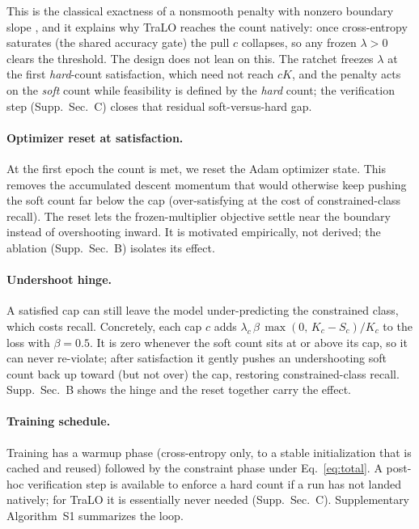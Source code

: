 \documentclass[letterpaper]{article} %
\begin{document}
\noindent This is the classical exactness of a nonsmooth penalty with nonzero boundary slope
\citep{bertsekas1982constrained,nocedal2006numerical}, and it explains why TraLO reaches the
count natively: once cross-entropy saturates (the shared accuracy gate) the pull $c$
collapses, so any frozen $\lambda>0$ clears the threshold. The design does not lean on this.
The ratchet freezes $\lambda$ at the first \emph{hard}-count satisfaction, which need not
reach $cK$, and the penalty acts on the \emph{soft} count while feasibility is defined by the
\emph{hard} count; the verification step (Supp.~Sec.~C) closes that residual soft-versus-hard
gap.

\paragraph{Optimizer reset at satisfaction.}
At the first epoch the count is met, we reset the Adam optimizer state. This removes the
accumulated descent momentum that would otherwise keep pushing the soft count far below
the cap (over-satisfying at the cost of constrained-class recall). The reset lets the
frozen-multiplier objective settle near the boundary instead of overshooting inward. It
is motivated empirically, not derived; the ablation (Supp.~Sec.~B) isolates its effect.

\paragraph{Undershoot hinge.}
A satisfied cap can still leave the model under-predicting the constrained class,
which costs recall. Concretely, each cap $c$ adds $\lambda_c\,\beta\,\max(0,\,K_c-S_c)/K_c$ to the loss
with $\beta{=}0.5$. It is zero whenever the soft count sits at or above its cap, so it
can never re-violate; after satisfaction it gently pushes an undershooting soft count
back up toward (but not over) the cap, restoring constrained-class recall.
Supp.~Sec.~B shows the hinge and the reset together carry the effect.

\paragraph{Training schedule.}
Training has a warmup phase (cross-entropy only, to a stable initialization that is
cached and reused) followed by the constraint phase under Eq.~\eqref{eq:total}. A
post-hoc verification step is available to enforce a hard count if a run has not landed
natively; for TraLO it is essentially never needed (Supp.~Sec.~C).
Supplementary Algorithm~S1 summarizes the loop.
\end{document}

